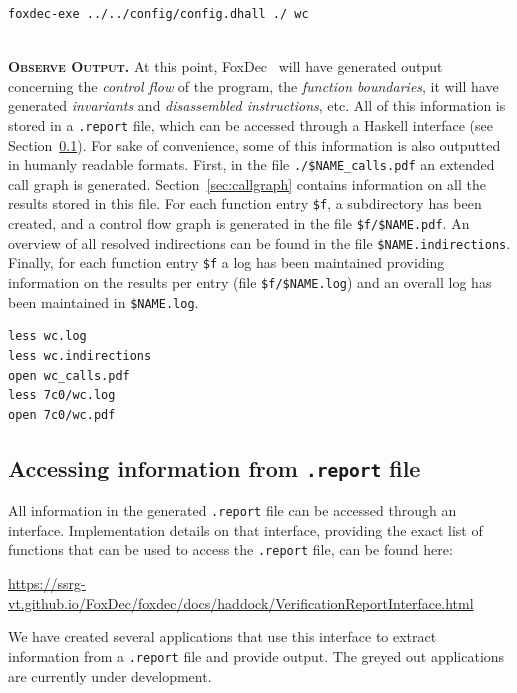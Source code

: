 \documentclass[12pt,a4paper]{article}
\newcommand{\begincodebox}[1]{
\vspace{1ex}
\begin{tcolorbox}[
    enhanced,
    attach boxed title to top left={xshift=6mm,yshift=-3mm},
    colback=moonstoneblue!20,
    colframe=moonstoneblue,
    colbacktitle=moonstoneblue,
    title=#1,
    fonttitle=\bfseries\color{black},
    boxed title style={size=small,colframe=moonstoneblue,sharp corners},
    sharp corners,
]
}
\newcommand{\codeboxend}{\end{tcolorbox}\noindent}
\newcommand{\foxdec}{\textsf{FoxDec}}
\newcommand{\beginpar}[1]{\noindent\textsc{\textbf{#1.}}}
\begin{document}
\begincodebox{Run FoxDec}
\begin{verbatim}
foxdec-exe ../../config/config.dhall ./ wc
\end{verbatim}
\codeboxend
\\

\beginpar{Observe Output} 
At this point, \foxdec~ will have generated output concerning the \emph{control flow} of the program, the \emph{function boundaries}, it will have generated \emph{invariants} and \emph{disassembled instructions}, etc.
All of this information is stored in a \texttt{.report} file, which can be accessed through a Haskell interface (see Section~\ref{sec:interface}).
For sake of convenience, some of this information is also outputted in humanly readable formats.
First, in the file \texttt{./\$NAME\_calls.pdf} an extended call graph is generated.
Section~\ref{sec:callgraph} contains information on all the results stored in this file.
For each function entry \texttt{\$f}, a subdirectory has been created, and a control flow graph is generated in the file \texttt{\$f/\$NAME.pdf}.
An overview of all resolved indirections can be found in the file \texttt{\$NAME.indirections}.
Finally, for each function entry \texttt{\$f} a log has been maintained providing information on the results per entry (file \texttt{\$f/\$NAME.log}) and an overall log has been maintained in \texttt{\$NAME.log}.

\begincodebox{Observe output}
\begin{verbatim}
less wc.log
less wc.indirections
open wc_calls.pdf
less 7c0/wc.log
open 7c0/wc.pdf
\end{verbatim}
\codeboxend


\subsection{Accessing information from \texttt{.report} file}\label{sec:interface}

All information in the generated \texttt{.report} file can be accessed through an interface.
Implementation details on that interface, providing the exact list of functions that can be used to access the \texttt{.report} file, can be found here:
\begin{center}
\url{https://ssrg-vt.github.io/FoxDec/foxdec/docs/haddock/VerificationReportInterface.html}
\end{center}

We have created several applications that use this interface to extract information from a \texttt{.report} file and provide output.
The greyed out applications are currently under development.
\\
\end{document}
